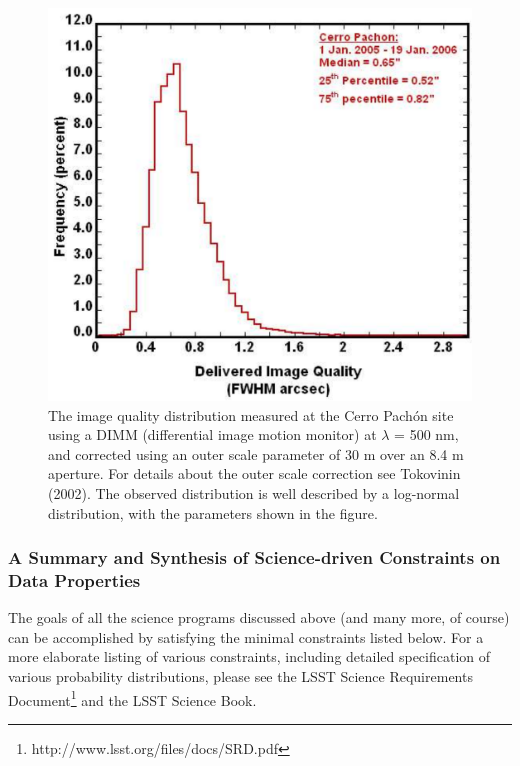 \documentclass{emulateapj}
\begin{document}
\begin{figure}
\includegraphics[width=1.0\hsize,clip]{seeing2.pdf}
\caption{
The image quality distribution measured at the Cerro Pach\'{o}n site using a
DIMM (differential image motion monitor) at $\lambda$ = 500 nm, and corrected 
using an outer scale parameter of 30 m over an 8.4 m aperture. For details 
about the outer scale correction see Tokovinin (2002). The observed distribution 
is well described by a log-normal distribution, with the parameters shown in 
the figure.} 
\label{Fig:seeing}
\end{figure}

\subsubsection{A Summary and Synthesis of Science-driven Constraints on Data Properties}

The goals of all the science programs discussed above 
(and many more, of course) can be accomplished by satisfying the 
minimal constraints listed below. For a more elaborate listing
of various constraints, including detailed specification of 
various probability distributions, please see the LSST Science
Requirements Document\footnote{http://www.lsst.org/files/docs/SRD.pdf}
and the LSST Science Book. 
\end{document}
